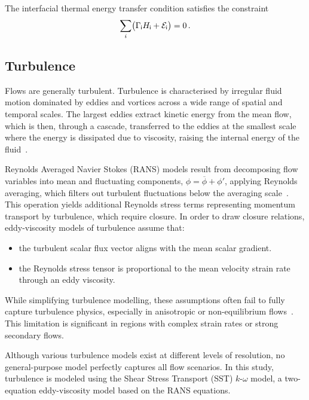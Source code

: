The interfacial thermal energy transfer condition satisfies the constraint
\begin{equation}
  \sum_{i}\bigl(\Gamma_{\mathsf {i}}H_{\mathsf {i}} + \mathcal{E}_{\mathsf {i}}\bigr) = 0\,.
\end{equation}


\subsection{Turbulence}\label{sec:turbs}
Flows are generally turbulent. Turbulence is characterised by irregular fluid motion dominated by
 eddies and vortices across a wide range of spatial and temporal scales. The largest eddies
 extract kinetic energy from the mean flow, which is then, through a cascade, transferred
 to the eddies at
 the smallest scale where the energy is dissipated due to viscosity, raising the 
 internal energy of the fluid~\cite{gilmanDevelopmentGeneralPurpose2014, davidsonIntroductionTurbulenceModels}.

Reynolds Averaged Navier Stokes (RANS) models result from decomposing flow variables into
 mean and fluctuating components, \(\displaystyle \phi = \overline{\phi} + \phi'\), applying Reynolds averaging,
 which filters out turbulent fluctuations below the
 averaging scale~\cite{besnardTurbulenceMultiphaseFlow1988a, hirschNumericalComputationInternal2007}.
 This operation yields additional Reynolds stress terms representing
 momentum transport by turbulence, which require closure.
 In order to draw closure relations, eddy-viscosity models of turbulence assume that:
 \begin{itemize}
    \item the turbulent scalar flux vector aligns with the mean scalar gradient.
    \item the Reynolds stress tensor is proportional to the mean velocity strain rate through an eddy viscosity.
 \end{itemize}
While simplifying turbulence modelling, these assumptions often fail to fully capture 
 turbulence physics, especially in anisotropic or non-equilibrium flows~\cite{popeTurbulentFlows2015}. 
 This limitation is significant in regions with complex strain rates or strong secondary flows. %

Although various turbulence models exist at different levels of resolution, no general-purpose model 
 perfectly captures all flow scenarios. In this study, turbulence is modeled using the Shear Stress 
 Transport (SST) \(k\)-\(\omega\) model, a two-equation eddy-viscosity model based on the RANS equations.

